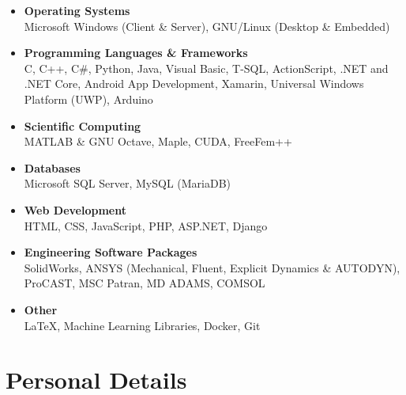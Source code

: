 \documentclass{cv}
\begin{document}
\begin{itemize}

\item
 \textbf{Operating Systems} \\ Microsoft Windows (Client \& Server), GNU/Linux (Desktop \& Embedded)
 \item
\textbf{Programming Languages \& Frameworks}\\  C, C++, C\#, Python, Java, Visual Basic, T-SQL, ActionScript, .NET and .NET Core, Android App Development, Xamarin, Universal Windows Platform (UWP), Arduino
\item
\textbf{Scientific Computing}\\  MATLAB \& GNU Octave, Maple, CUDA, FreeFem++
\item
\textbf{Databases}\\ Microsoft SQL Server, MySQL (MariaDB)
\item
\textbf{Web Development} \\
HTML, CSS, JavaScript, PHP, ASP.NET, Django
\item
\textbf{Engineering Software Packages}\\ SolidWorks, ANSYS (Mechanical, Fluent, Explicit Dynamics \& AUTODYN), ProCAST, MSC Patran, MD ADAMS, COMSOL
\item
\textbf{Other}\\  \LaTeX{}, Machine Learning Libraries, Docker, Git

\end{itemize}


\section{Personal Details}
\end{document}
